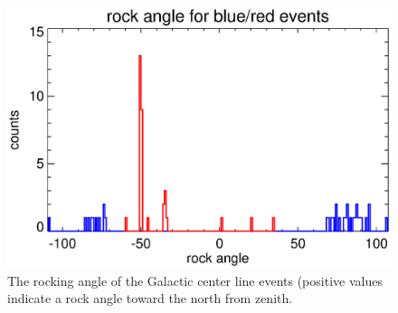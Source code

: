\documentclass[aps,twocolumn,prd,superscriptaddress,showpacs,nofootinbib,fixfloat]{revtex4}
\begin{document}
\begin{figure}
  \centering
  \includegraphics[width=0.9\linewidth]{plots/rockangle.ps}
  \caption{The rocking angle of the Galactic center line
  events (positive values indicate a rock angle toward the
  north from zenith.}
  \label{fig:rock}
\end{figure}



\end{document}
